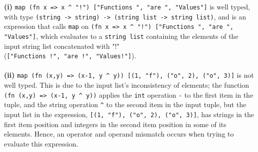 \documentclass[11pt]{article}
\renewcommand{\part}[1] {\vspace{.10in} {\bf (#1)}}
\begin{document}
\begin{enumerate}
\part{i} \verb|map (fn x => x ^ "!") ["Functions ", "are ", "Values"]| is well typed, with type \verb|(string -> string) -> (string list -> string list)|, and is an expression that calls \verb|map| on \verb|(fn x => x ^ "!") ["Functions ", "are ", "Values"]|, which evaluates to a \verb|string list| containing the elements of the input string list concatenated with "!"\\
(\verb|["Functions !", "are !", "Values!"]|).\\\\
\part{ii} \verb|map (fn (x,y) => (x-1, y ^ y)) [(1, "f"), ("o", 2), ("o", 3)]| is not well typed.  This is due to the input list's inconsistency of elements; the function \verb|(fn (x,y) => (x-1, y ^ y))| applies the \verb|int| operation \verb|-| to the first item in the tuple, and the string operation \verb|^| to the second item in the input tuple, but the input list in the expression, \verb|[(1, "f"), ("o", 2), ("o", 3)]|, has strings in the first item position and integers in the second item position in some of its elements.  Hence, an operator and operand mismatch occurs when trying to evaluate this expression.\\
\end{enumerate}
\end{document}
